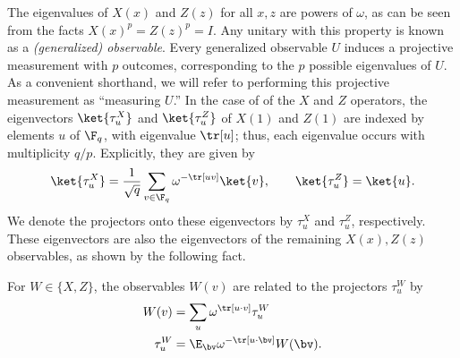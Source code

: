 \documentclass[11pt]{article}
\begin{document}
The eigenvalues of $X(x)$ and $Z(z)$ for
all $x, z$ are powers
of $\omega$, as can be seen from the facts $X(x)^p = Z(z)^p =
I$. Any unitary with this property is known as a \emph{(generalized)
  observable}. Every generalized observable $U$ induces a projective
measurement with $p$ outcomes, corresponding to the $p$ possible eigenvalues of
$U$. As a convenient shorthand, we will refer to performing this projective
measurement as ``measuring $U$.''  In the case of of the $X$ and $Z$
operators, the
eigenvectors $\ket{\tau^X_u}$ and $\ket{\tau^Z_u}$ of $X(1)$ and $Z(1)$ are indexed by elements $u$ of $\F_q$,
with eigenvalue $\tr[u]$; thus, each eigenvalue occurs with
multiplicity $q/p$. Explicitly, they are given by
\begin{equation}\label{eq:pauli-eigenstates}
  \ket{\tau^X_u} = \frac{1}{\sqrt{q}} \sum_{v \in \F_q}
  \omega^{-\tr[uv]} \ket{v},\qquad \ket{\tau^Z_u} = \ket{u}.
  \end{equation}
We denote the projectors onto these eigenvectors by $\tau^X_u$ and
$\tau^Z_u$, respectively. These eigenvectors are also the eigenvectors
of the remaining $X(x), Z(z)$ observables, as shown by the following fact.
\begin{fact}
  For $W \in \{X, Z\}$, the observables $W(v)$ are related to the
  projectors $\tau^W_u$ by
  \begin{align}
    W(v) &= \sum_{u} \omega^{\tr[u \cdot v]}
           \tau^W_u \label{eq:pauli-obs-to-proj} \\
    \tau^W_u &= \E_{\bv} \omega^{-\tr[u \cdot \bv]} W(\bv). \label{eq:pauli-proj-to-obs}
  \end{align}
\end{fact}
\end{document}

